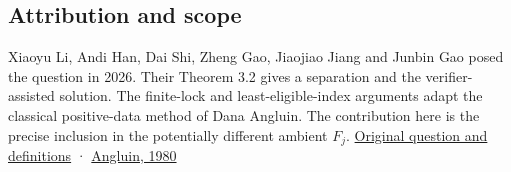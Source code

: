 \documentclass[11pt]{article}
\begin{document}
\subsection{Attribution and scope}\label{attribution-and-scope}

Xiaoyu Li, Andi Han, Dai Shi, Zheng Gao, Jiaojiao Jiang and Junbin Gao posed the question in 2026. Their Theorem 3.2 gives a separation and the verifier-assisted solution. The finite-lock and least-eligible-index arguments adapt the classical positive-data method of Dana Angluin. The contribution here is the precise inclusion in the potentially different ambient \(F_j\). \href{https://arxiv.org/abs/2606.14688v1}{Original question and definitions} · \href{https://doi.org/10.1016/S0019-9958(80)90285-5}{Angluin, 1980}
\end{document}
